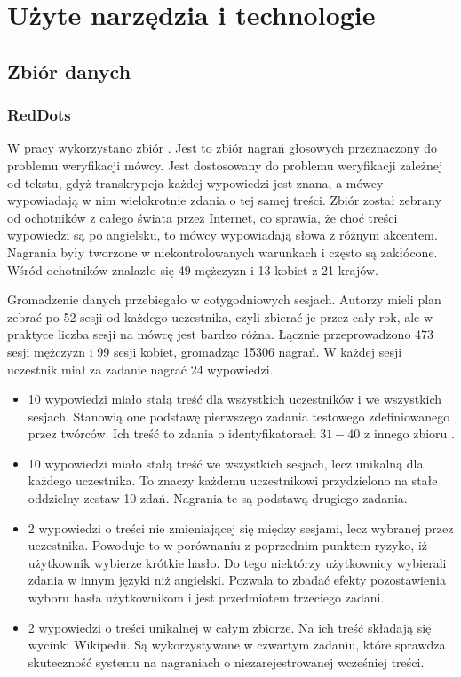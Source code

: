 \chapter{Użyte narzędzia i technologie}\label{chap:technologie}

\section{Zbiór danych}\label{sec:zbior_danych}

\subsection{RedDots}

W pracy wykorzystano zbiór \cite{theReddotsDataCollection}.
Jest to zbiór nagrań głosowych przeznaczony do problemu weryfikacji mówcy.
Jest dostosowany do problemu weryfikacji zależnej od tekstu, gdyż transkrypcja każdej wypowiedzi jest znana,
a mówcy wypowiadają w nim wielokrotnie zdania o tej samej treści. Zbiór został zebrany od ochotników z całego
świata przez Internet, co sprawia, że choć treści wypowiedzi są po angielsku, to mówcy wypowiadają słowa
z różnym akcentem. Nagrania były tworzone w niekontrolowanych warunkach i często są zakłócone.
Wśród ochotników znalazło się 49 mężczyzn i 13 kobiet z 21 krajów.

Gromadzenie danych przebiegało w cotygodniowych sesjach. Autorzy mieli plan zebrać po 52 sesji od każdego uczestnika,
czyli zbierać je przez cały rok, ale w praktyce liczba sesji na mówcę jest bardzo różna. Łącznie przeprowadzono
473 sesji mężczyzn i 99 sesji kobiet, gromadząc 15306 nagrań. W każdej sesji uczestnik miał za zadanie nagrać 24 wypowiedzi.

\begin{itemize}
    \item 10 wypowiedzi miało stałą treść dla wszystkich uczestników i we wszystkich sesjach. Stanowią one podstawę
        pierwszego zadania testowego zdefiniowanego przez twórców. Ich treść to zdania o identyfikatorach $31-40$
        z innego zbioru \cite{darpaTimitAcoustic}.
    \item 10 wypowiedzi miało stałą treść we wszystkich sesjach, lecz unikalną dla każdego uczestnika. To znaczy
        każdemu uczestnikowi przydzielono na stałe oddzielny zestaw 10 zdań. Nagrania te są podstawą drugiego zadania.
    \item 2 wypowiedzi o treści nie zmieniającej się między sesjami, lecz wybranej przez uczestnika. Powoduje
        to w porównaniu z poprzednim punktem ryzyko, iż użytkownik wybierze krótkie hasło. Do tego niektórzy
        użytkownicy wybierali zdania w innym języki niż angielski. Pozwala to zbadać efekty pozostawienia wyboru hasła
        użytkownikom i jest przedmiotem trzeciego zadani.
    \item 2 wypowiedzi o treści unikalnej w całym zbiorze. Na ich treść składają się wycinki Wikipedii. Są wykorzystywane
        w czwartym zadaniu, które sprawdza skuteczność systemu na nagraniach o niezarejestrowanej wcześniej treści.
\end{itemize}

